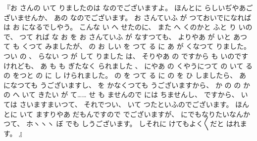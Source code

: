 『お
さんの
いて
りましたのは
なのでございますよ。
%
ほんとに
らしいぢやあございませんか、
%
あの
なのでございます。
%
お
さんていふ
が
つておいでになれば
は
お
になるでしやう。
%
こんな
い
へ
せたのに、
%
また
へ
くのかと
ふと
り
いので、
%
つて
れば
な
お
を
お
さんていふ
が
なすつても、
%
よりやあ
が
いと
あつて
も
くつて
みましたが、
%
の
お
しい
を
つて
る
に
あ
が
くなつて
りました。
%
つい
の
、
%
らない
つ
が
して
りました
は、
%
そりやあ
の
ですから
も
いのですけれども、
%
あ
も
も
ぎたなく
られました
、
%
にやあ
の
くやうにつて
の
いて
る
の
をつと
の
に
し
けられました。
%
の
を
つて
る
に
の
を
ひ
しましたら、
%
あ
になつても
うございますし、
%
を
かなくつても
うございますから、
%
か
の
の
かの
へ
いて
きたい
が
て……
せ
も
ませんので
には
ちませんし、
%
ですから、
%
いては
さいますまいつて、
%
それでつい、
%
いて
つたといふのでございます。
%
ほんとに
いて
ますりやあ
だもんですので
でございますが、%
%
にでもなりたいなんかつて、
%
ホヽヽヽ
ぼ
でも
しうございます。
%
しそれに
けてもよく〳〵だと
はれます。
』

